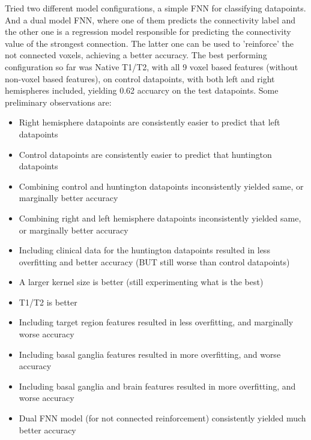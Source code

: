 Tried two different model configurations, a simple FNN for classifying datapoints. And a dual model FNN, where one of them predicts the connectivity label and the other one is a regression model responsible for predicting the connectivity value of the strongest connection. The latter one can be used to 'reinforce' the not connected voxels, achieving a better accuracy. The best performing configuration so far was Native T1/T2, with all 9 voxel based features (without non-voxel based features), on control datapoints, with both left and right hemispheres included, yielding 0.62 accuarcy on the test datapoints. Some preliminary observations are:

\begin{itemize}
  \item Right hemisphere datapoints are consistently easier to predict that left datapoints
  \item Control datapoints are consistently easier to predict that huntington datapoints
  \item Combining control and huntington datapoints inconsistently yielded same, or marginally better accuracy
  \item Combining right and left hemisphere datapoints inconsistently yielded same, or marginally better accuracy
  \item Including clinical data for the huntington datapoints resulted in less overfitting and better accuracy (BUT still worse than control datapoints)
  \item A larger kernel size is better (still experimenting what is the best)
  \item T1/T2 is better
  \item Including target region features resulted in less overfitting, and marginally worse accuracy
  \item Including basal ganglia features resulted in more overfitting, and worse accuracy
  \item Including basal ganglia and brain features resulted in more overfitting, and worse accuracy
  \item Dual FNN model (for not connected reinforcement) consistently yielded much better accuracy
\end{itemize}






